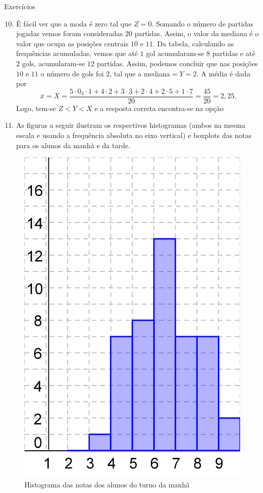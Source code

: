 \begin{answer}{Exercícios}
{\exerciselist
  \begin{enumerate}\setcounter{enumi}{9}
  \item É fácil ver que a moda é zero tal que $Z=0$. Somando o número de partidas jogadas vemos foram consideradas $20$ partidas. Assim, o valor da mediana é o valor que ocupa as posições centrais $10$ e $11$. Da tabela, calculando as frequências acumuladas, vemos que até $1$ gol acumularam-se $8$ partidas e até $2$ gols, acumularam-se $12$ partidas. Assim, podemos concluir que nas posições $10$ e $11$ o número de gols foi $2$, tal que a mediana$=Y=2$. A média é dada por
  \begin{equation*}
  \bar{x}=X=\frac{5\cdot0_3\cdot1+4\cdot2+3\cdot3+2\cdot4+2\cdot5+1\cdot7}{20}=\frac{45}{20}=2{,}25.
  \end{equation*}
  Logo, tem-se $Z<Y<X$ e a resposta correta encontra-se na opção 
  \item As figuras a seguir ilustram os respectivos histogramas (ambos na mesma escala e usando a frequência absoluta no eixo vertical) e boxplots das notas para os alunos da manhã e da tarde.
  \end{enumerate}
\begin{multicols}{2}
    \begin{figure}[H]
  \centering
  
  \includegraphics[width=.6\linewidth]{histograma_turma_manha_1.png}
  \caption{Histograma das notas dos alunos do turno da manhã}
  \label{}
  \end{figure}
  \begin{figure}[H]
  \centering
  

\end{figure}
\end{multicols}}
\end{answer}

